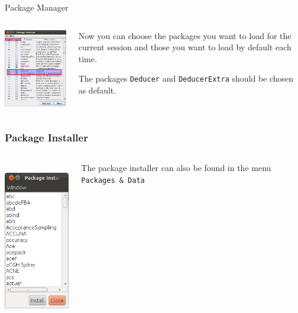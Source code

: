 \documentclass[xcolor={table}]{beamer}
\begin{document}
\begin{frame}[shrink=5]{Package Manager}
    \vspace*{0.5cm}
\begin{columns}[c]
  \begin{column}{0.5\textwidth}
  \includegraphics[width=5.5cm]{packman1.png}
  \end{column}
  \begin{column}{0.5\textwidth}Now you can choose the packages you want to load for the current session and those you want to load by default each time. 

The packages \texttt{Deducer} and \texttt{DeducerExtra} should be chosen as default.
  \end{column}
 \end{columns}
\end{frame}

\begin{frame}\frametitle{Package Installer}
  \begin{columns}
    \begin{column}{0.3\textwidth}
      \includegraphics[height=7cm]{packinst1.png}
    \end{column}
    \begin{column}{0.7\textwidth}
      The package installer can also be found in the menu \texttt{Packages \& Data}
    \end{column}
  \end{columns}
\end{frame}
\end{document}
